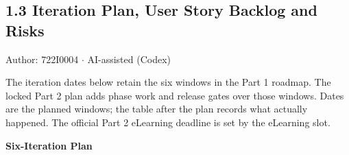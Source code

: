 \subsection*{1.3 Iteration Plan, User Story Backlog and Risks}
Author: 722I0004 \ensuremath{\cdot} AI-assisted (Codex)

The iteration dates below retain the six windows in the Part 1 roadmap. The locked Part 2 plan adds phase work and release gates over those windows. Dates are the planned windows; the table after the plan records what actually happened. The official Part 2 eLearning deadline is set by the eLearning slot.

\textbf{Six-Iteration Plan}

